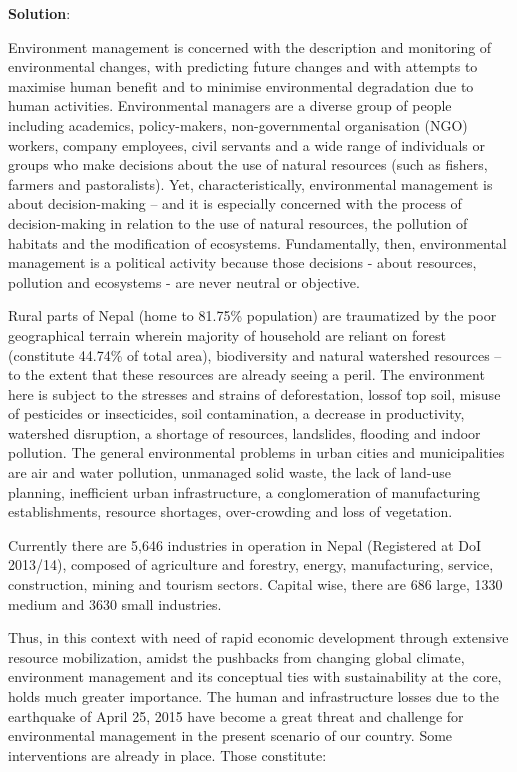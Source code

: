 \documentclass[
  openany]{book}
\newenvironment{solution}{ {\bfseries Solution}:}{}
\begin{document}
\begin{questions}
\begin{solution}

Environment management is concerned with the description and monitoring of environmental changes, with predicting future changes and with attempts to maximise human benefit and to minimise environmental degradation due to human activities. Environmental managers are a diverse group of people including academics, policy-makers, non-governmental organisation (NGO) workers, company employees, civil servants and a wide range of individuals or groups who make decisions about the use of natural resources (such as fishers, farmers and pastoralists). Yet, characteristically, environmental management is about decision-making -- and it is especially concerned with the process of decision-making in relation to the use of natural resources, the pollution of habitats and the modification of ecosystems. Fundamentally, then, environmental management is a political activity because those decisions - about resources, pollution and ecosystems - are never neutral or objective.

Rural parts of Nepal (home to 81.75\% population) are traumatized by the poor geographical terrain wherein majority of household are reliant on forest (constitute 44.74\% of total area), biodiversity and natural watershed resources -- to the extent that these resources are already seeing a peril. The environment here is subject to the stresses and strains of deforestation, lossof top soil, misuse of pesticides or insecticides, soil contamination, a decrease in productivity, watershed disruption, a shortage of resources, landslides, flooding and indoor pollution. The general environmental problems in urban cities and municipalities are air and water pollution, unmanaged solid waste, the lack of land-use planning, inefficient urban infrastructure, a conglomeration of manufacturing establishments, resource shortages, over-crowding and loss of vegetation.

Currently there are 5,646 industries in operation in Nepal (Registered at DoI 2013/14), composed of agriculture and forestry, energy, manufacturing, service, construction, mining and tourism sectors. Capital wise, there are 686 large, 1330 medium and 3630 small industries.

Thus, in this context with need of rapid economic development through extensive resource mobilization, amidst the pushbacks from changing global climate, environment management and its conceptual ties with sustainability at the core, holds much greater importance. The human and infrastructure losses due to the earthquake of April 25, 2015 have become a great threat and challenge for environmental management in the present scenario of our country. Some interventions are already in place. Those constitute:


\end{solution}
\end{questions}
\end{document}
